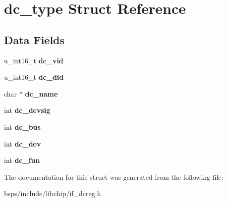 \hypertarget{structdc__type}{}\section{dc\+\_\+type Struct Reference}
\label{structdc__type}
\subsection*{Data Fields}
\begin{DoxyCompactItemize}
\item 
\mbox{\label{structdc__type_ab1b689641b71feedc6aee56dff35d48d}} 
u\+\_\+int16\+\_\+t {\bfseries dc\+\_\+vid}
\item 
\mbox{\label{structdc__type_aedb611f4052209e398ad25e6e0dfa69d}} 
u\+\_\+int16\+\_\+t {\bfseries dc\+\_\+did}
\item 
\mbox{\label{structdc__type_aac22498d4d8b794c1d8585600ee21390}} 
char $\ast$ {\bfseries dc\+\_\+name}
\item 
\mbox{\label{structdc__type_af9e3364f9268e71eee8b95e6808fe52d}} 
int {\bfseries dc\+\_\+devsig}
\item 
\mbox{\label{structdc__type_ae0042a6748fbdb30ad1902076ba2862d}} 
int {\bfseries dc\+\_\+bus}
\item 
\mbox{\label{structdc__type_a98d2d4bac9e5a47a45d057358021aef4}} 
int {\bfseries dc\+\_\+dev}
\item 
\mbox{\label{structdc__type_a03871c39bda46c443e433aa28bca8706}} 
int {\bfseries dc\+\_\+fun}
\end{DoxyCompactItemize}


The documentation for this struct was generated from the following file\+:\begin{DoxyCompactItemize}
\item 
bsps/include/libchip/if\+\_\+dcreg.\+h\end{DoxyCompactItemize}
